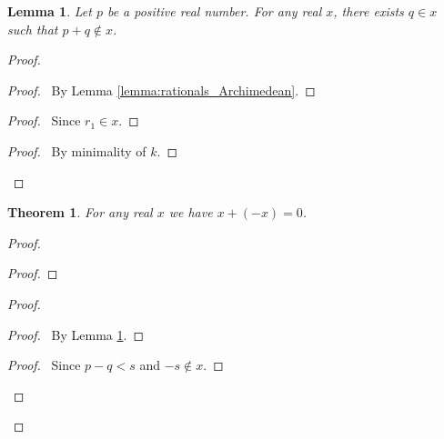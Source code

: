 \documentclass{article}
\let\qed\relax
\newtheorem{lemma}[axiom]{Lemma}
\newtheorem{theorem}[axiom]{Theorem}
\theoremstyle{definition}
\begin{document}
    \begin{lemma}
        \label{lemma:reals_pre_negation}
        Let $p$ be a positive real number. For any real $x$, there exists $q \in x$
        such that $p + q \notin x$.
    \end{lemma}

    \begin{proof}
        \pf
        \begin{proof}
            \pf\ By Lemma \ref{lemma:rationals_Archimedean}.
        \end{proof}
        \begin{proof}
            \pf\ Since $r_1 \in x$.
        \end{proof}
        \begin{proof}
            \pf\ By minimality of $k$.
        \end{proof}
        \qed
    \end{proof}

    \begin{theorem}
        For any real $x$ we have $x + (-x) = 0$.
    \end{theorem}

    \begin{proof}
        \pf
        \begin{proof}
        \end{proof}
        \begin{proof}
            \begin{proof}
                \pf\ By Lemma \ref{lemma:reals_pre_negation}.
            \end{proof}
            \begin{proof}
                \pf\ Since $p-q < s$ and $-s \notin x$.
            \end{proof}
        \end{proof}
        \qed
    \end{proof}
    
\end{document}
